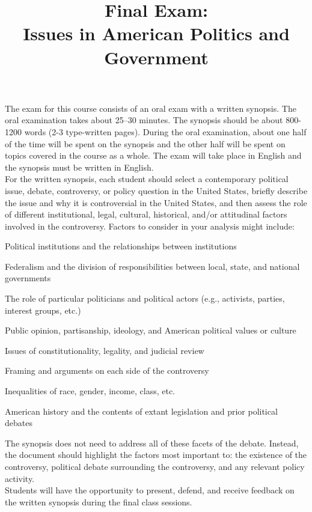 \documentclass[12pt,a4paper]{article}
\title{Final Exam:\\Issues in American Politics and Government}
\author{}
\date{}
\begin{document}
\maketitle

The exam for this course consists of an oral exam with a written synopsis. The oral examination takes about 25--30 minutes. The synopsis should be about 800-1200 words (2-3 type-written pages). During the oral examination, about one half of the time will be spent on the synopsis and the other half will be spent on topics covered in the course as a whole. The exam will take place in English and the synopsis must be written in English.\\

For the written synopsis, each student should select a contemporary political issue, debate, controversy, or policy question in the United States, briefly describe the issue and why it is controversial in the United States, and then assess the role of different institutional, legal, cultural, historical, and/or attitudinal factors involved in the controversy. Factors to consider in your analysis might include:

\begin{itemize*}
\item Political institutions and the relationships between institutions
\item Federalism and the division of responsibilities between local, state, and national governments
\item The role of particular politicians and political actors (e.g., activists, parties, interest groups, etc.)
\item Public opinion, partisanship, ideology, and American political values or culture
\item Issues of constitutionality, legality, and judicial review
\item Framing and arguments on each side of the controversy
\item Inequalities of race, gender, income, class, etc.
\item American history and the contents of extant legislation and prior political debates
\end{itemize*}

The synopsis does not need to address all of these facets of the debate. Instead, the document should highlight the factors most important to: the existence of the controversy, political debate surrounding the controversy, and any relevant policy activity.\\

Students will have the opportunity to present, defend, and receive feedback on the written synopsis during the final class sessions.\\
\end{document}
